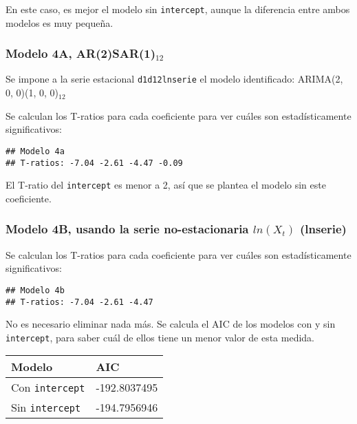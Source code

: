 \documentclass[
]{article}
\begin{document}
En este caso, es mejor el modelo sin \texttt{intercept}, aunque la
diferencia entre ambos modelos es muy pequeña.

\medskip

\hypertarget{modelo-4a-ar2sar1_12}{%
\subsubsection{\texorpdfstring{Modelo 4A,
AR(2)SAR(1)\(_{12}\)}{Modelo 4A, AR(2)SAR(1)\_\{12\}}}\label{modelo-4a-ar2sar1_12}}

Se impone a la serie estacional \texttt{d1d12lnserie} el modelo
identificado: ARIMA(2, 0, 0)(1, 0, 0)\(_{12}\)

Se calculan los T-ratios para cada coeficiente para ver cuáles son
estadísticamente significativos:

\begin{verbatim}
## Modelo 4a 
## T-ratios: -7.04 -2.61 -4.47 -0.09
\end{verbatim}

El T-ratio del \texttt{intercept} es menor a 2, así que se plantea el
modelo sin este coeficiente.

\medskip

\hypertarget{modelo-4b-usando-la-serie-no-estacionaria-lnx_t-lnserie}{%
\subsubsection{\texorpdfstring{Modelo 4B, usando la serie
no-estacionaria \(ln(X_t)\)
(lnserie)}{Modelo 4B, usando la serie no-estacionaria ln(X\_t) (lnserie)}}\label{modelo-4b-usando-la-serie-no-estacionaria-lnx_t-lnserie}}

Se calculan los T-ratios para cada coeficiente para ver cuáles son
estadísticamente significativos:

\begin{verbatim}
## Modelo 4b 
## T-ratios: -7.04 -2.61 -4.47
\end{verbatim}

No es necesario eliminar nada más. Se calcula el AIC de los modelos con
y sin \texttt{intercept}, para saber cuál de ellos tiene un menor valor
de esta medida.

\begin{longtable}[]{@{}ll@{}}
\toprule()
Modelo & AIC \\
\midrule()
\endhead
Con \texttt{intercept} & -192.8037495 \\
Sin \texttt{intercept} & -194.7956946 \\
\bottomrule()
\end{longtable}
\end{document}
